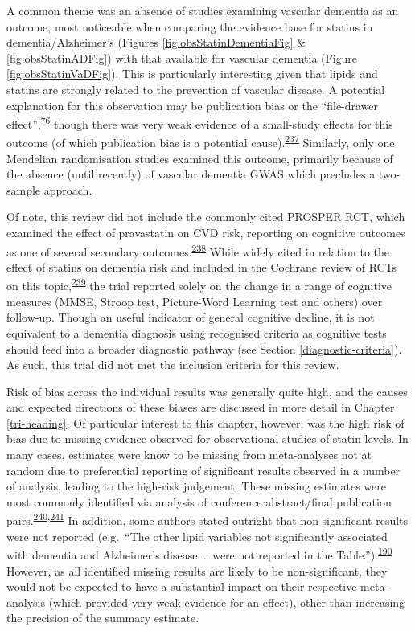 \documentclass[a4paper, twoside]{templates/ociamthesis}
\begin{document}
A common theme was an absence of studies examining vascular dementia as an outcome, most noticeable when comparing the evidence base for statins in dementia/Alzheimer's (Figures \ref{fig:obsStatinDementiaFig} \& \ref{fig:obsStatinADFig}) with that available for vascular dementia (Figure \ref{fig:obsStatinVaDFig}). This is particularly interesting given that lipids and statins are strongly related to the prevention of vascular disease. A potential explanation for this observation may be publication bias or the ``file-drawer effect'',\textsuperscript{\protect\hyperlink{ref-rosenthal1979}{76}} though there was very weak evidence of a small-study effects for this outcome (of which publication bias is a potential cause).\textsuperscript{\protect\hyperlink{ref-sterne2011}{237}} Similarly, only one Mendelian randomisation studies examined this outcome, primarily because of the absence (until recently) of vascular dementia GWAS which precludes a two-sample approach.

Of note, this review did not include the commonly cited PROSPER RCT, which examined the effect of pravastatin on CVD risk, reporting on cognitive outcomes as one of several secondary outcomes.\textsuperscript{\protect\hyperlink{ref-shepherd2002a}{238}} While widely cited in relation to the effect of statins on dementia risk and included in the Cochrane review of RCTs on this topic,\textsuperscript{\protect\hyperlink{ref-mcguinness2016}{239}} the trial reported solely on the change in a range of cognitive measures (MMSE, Stroop test, Picture-Word Learning test and others) over follow-up. Though an useful indicator of general cognitive decline, it is not equivalent to a dementia diagnosis using recognised criteria as cognitive tests should feed into a broader diagnostic pathway (see Section \ref{diagnostic-criteria}). As such, this trial did not met the inclusion criteria for this review.

Risk of bias across the individual results was generally quite high, and the causes and expected directions of these biases are discussed in more detail in Chapter \ref{tri-heading}. Of particular interest to this chapter, however, was the high risk of bias due to missing evidence observed for observational studies of statin levels. In many cases, estimates were know to be missing from meta-analyses not at random due to preferential reporting of significant results observed in a number of analysis, leading to the high-risk judgement. These missing estimates were most commonly identified via analysis of conference abstract/final publication pairs.\textsuperscript{\protect\hyperlink{ref-yamada2009}{240},\protect\hyperlink{ref-yamada2009a}{241}} In addition, some authors stated outright that non-significant results were not reported (e.g.~``The other lipid variables not significantly associated with dementia and Alzheimer's disease \ldots{} were not reported in the Table.'').\textsuperscript{\protect\hyperlink{ref-ancelin2013}{190}} However, as all identified missing results are likely to be non-significant, they would not be expected to have a substantial impact on their respective meta-analysis (which provided very weak evidence for an effect), other than increasing the precision of the summary estimate.
\end{document}
